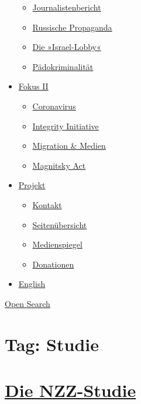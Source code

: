 \begin{itemize}
  \begin{itemize}
  \tightlist
  \item
    \href{https://swprs.org/bericht-eines-journalisten/}{Journalistenbericht}
  \item
    \href{https://swprs.org/russische-propaganda/}{Russische Propaganda}
  \item
    \href{https://swprs.org/die-israel-lobby-fakten-und-mythen/}{Die
    »Israel-Lobby«}
  \item
    \href{https://swprs.org/geopolitik-und-paedokriminalitaet/}{Pädokriminalität}
  \end{itemize}
\item
  \href{https://swprs.org/migration-und-medien/}{Fokus II}

  \begin{itemize}
  \tightlist
  \item
    \href{https://swprs.org/covid-19-hinweis-ii/}{Coronavirus}
  \item
    \href{https://swprs.org/die-integrity-initiative/}{Integrity
    Initiative}
  \item
    \href{https://swprs.org/migration-und-medien/}{Migration \& Medien}
  \item
    \href{https://swprs.org/der-fall-magnitsky/}{Magnitsky Act}
  \end{itemize}
\item
  \href{https://swprs.org/kontakt/}{Projekt}

  \begin{itemize}
  \tightlist
  \item
    \href{https://swprs.org/kontakt/}{Kontakt}
  \item
    \href{https://swprs.org/uebersicht/}{Seitenübersicht}
  \item
    \href{https://swprs.org/medienspiegel/}{Medienspiegel}
  \item
    \href{https://swprs.org/donationen/}{Donationen}
  \end{itemize}
\item
  \href{https://swprs.org/contact/}{English}
\end{itemize}

\protect\hyperlink{}{Open Search}

\hypertarget{tag-studie}{%
\section{Tag: Studie}\label{tag-studie}}

\hypertarget{die-nzz-studie}{%
\section{\texorpdfstring{\href{https://swprs.org/2017/03/01/die-nzz-studie/}{Die
NZZ-Studie}}{Die NZZ-Studie}}\label{die-nzz-studie}}

